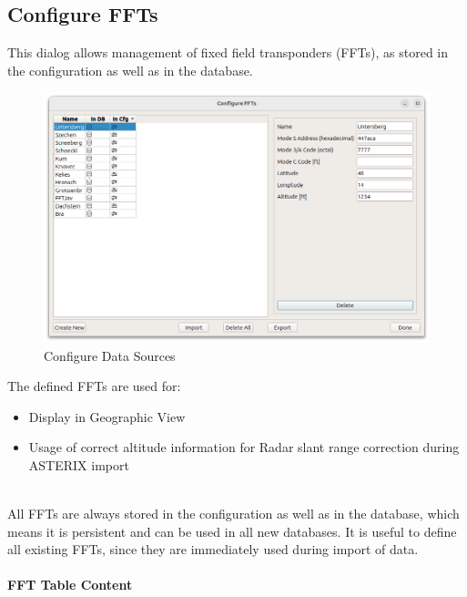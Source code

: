 \subsection{Configure FFTs}
\label{sec:ui_configure_ffts}

This dialog allows management of fixed field transponders (FFTs), as stored in the configuration as well as in the database. \\

\begin{figure}[H]
    \hspace*{-2cm}
    \includegraphics[width=18cm]{figures/configure_ffts.png}
  \caption{Configure Data Sources}
\end{figure}

The defined FFTs are used for:
\begin{itemize}
\item Display in Geographic View
\item Usage of correct altitude information for Radar slant range correction during ASTERIX import
\end{itemize}
\ \\

All FFTs are always stored in the configuration as well as in the database, which means it is persistent and can be used in all new databases. It is useful to define all existing FFTs, since they are immediately used during import of data. \\

\paragraph {FFT Table Content}
\label{sec:configure_ffts_table_content}

